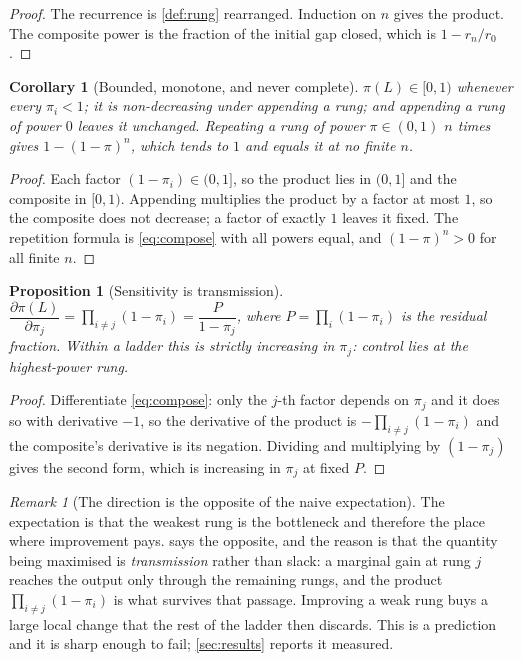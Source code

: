 \documentclass[11pt,twocolumn,a4paper]{article}
\theoremstyle{plain}
\newtheorem{proposition}[theorem]{Proposition}
\newtheorem{corollary}[theorem]{Corollary}
\theoremstyle{definition}
\theoremstyle{remark}
\newtheorem{remark}[theorem]{Remark}
\newcommand{\pow}{\pi}
\newcommand{\gap}{r}
\newcommand{\Lad}{L}
\begin{document}
\begin{proof}
The recurrence is \cref{def:rung} rearranged. Induction on $n$ gives the
product. The composite power is the fraction of the initial gap closed, which
is $1-\gap_n/\gap_0$.
\end{proof}

\begin{corollary}[Bounded, monotone, and never complete]
\label{cor:bounded}
$\pow(\Lad)\in[0,1)$ whenever every $\pow_i<1$; it is non-decreasing under
appending a rung; and appending a rung of power $0$ leaves it unchanged.
Repeating a rung of power $\pow\in(0,1)$ $n$ times gives $1-(1-\pow)^n$, which
tends to $1$ and equals it at no finite $n$.
\end{corollary}

\begin{proof}
Each factor $(1-\pow_i)\in(0,1]$, so the product lies in $(0,1]$ and the
composite in $[0,1)$. Appending multiplies the product by a factor at most $1$,
so the composite does not decrease; a factor of exactly $1$ leaves it fixed.
The repetition formula is \cref{eq:compose} with all powers equal, and
$(1-\pow)^n>0$ for all finite $n$.
\end{proof}

\begin{proposition}[Sensitivity is transmission]
\label{prop:sensitivity}
$\dfrac{\partial\pow(\Lad)}{\partial\pow_j}=\prod_{i\neq j}(1-\pow_i)
 =\dfrac{P}{1-\pow_j}$, where $P=\prod_i(1-\pow_i)$ is the residual fraction.
Within a ladder this is strictly increasing in $\pow_j$: control lies at the
\emph{highest}-power rung.
\end{proposition}

\begin{proof}
Differentiate \cref{eq:compose}: only the $j$-th factor depends on $\pow_j$ and
it does so with derivative $-1$, so the derivative of the product is
$-\prod_{i\neq j}(1-\pow_i)$ and the composite's derivative is its negation.
Dividing and multiplying by $(1-\pow_j)$ gives the second form, which is
increasing in $\pow_j$ at fixed $P$.
\end{proof}

\begin{remark}[The direction is the opposite of the naive expectation]
\label{rem:direction}
The expectation is that the weakest rung is the bottleneck and therefore the
place where improvement pays.  says the opposite, and
the reason is that the quantity being maximised is \emph{transmission} rather
than slack: a marginal gain at rung $j$ reaches the output only through the
remaining rungs, and the product $\prod_{i\neq j}(1-\pow_i)$ is what survives
that passage. Improving a weak rung buys a large local change that the rest of
the ladder then discards. This is a prediction and it is sharp enough to fail;
\cref{sec:results} reports it measured.
\end{remark}
\end{document}
